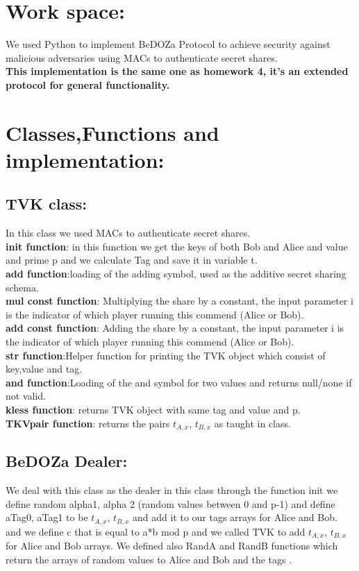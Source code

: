 \documentclass{article}
\begin{document}
\section*{Work space:}
We used Python to implement BeDOZa Protocol to achieve security against malicious adversaries using MACs to authenticate secret shares.
\\\textbf{This implementation is the same one as homework 4, it's an extended protocol for general functionality. }
\section*{Classes,Functions and implementation:}
\subsection*{TVK class:}
In this class we used MACs to authenticate secret shares.
\\ \textbf{init function}: in this function we get the keys of both Bob and Alice and value and prime p and we calculate Tag and save it in variable t.
\\ \textbf{add function}:loading of the adding symbol, used as the additive secret sharing schema.
\\ \textbf{ mul const function}: Multiplying the share by a constant, the input parameter i is the indicator of which player running this commend (Alice or Bob).
\\ \textbf{add const function}: Adding the share by a constant, the input parameter i is the indicator of which player running this commend (Alice or Bob).
\\ \textbf{str function}:Helper function for printing the TVK object which consist of key,value and tag.
\\ \textbf{and function}:Loading of the and symbol for two values and returns null/none if not valid.
\\ \textbf{kless function}: returns TVK object with same tag and value and p.
 \\ \textbf{TKVpair function}: returns the pairs $t_{A,x}$, $t_{B,x}$  as taught in class.
\subsection*{BeDOZa Dealer:}
We deal with this class as the dealer in this class through the function init we define random alpha1, alpha 2 (random values between 0 and p-1) and define aTag0, aTag1 to be $t_{A,x}$, $t_{B,x}$ and add it to our tags arrays for Alice and Bob.  and we define c that is equal to a*b mod p and we called TVK to add $t_{A,x}$, $t_{B,x}$ for Alice and Bob arrays.
We defined also RandA and RandB  functions which return the arrays of random values to Alice and Bob and the tags .
\end{document}
